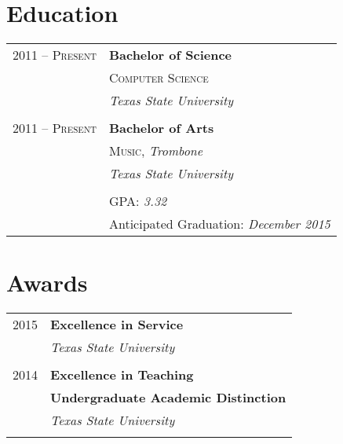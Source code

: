 \documentclass[10pt]{article} %
\begin{document}
\begin{minipage}[t]{0.44\textwidth}

\section{Education} 

\begin{tabular}{rl} %


2011 -- \textsc{Present} & \textbf{Bachelor of Science} \\ 
& \textsc{Computer Science} \\ 
& \textit{Texas State University}\\
&\\
	 

2011 -- \textsc{Present} & \textbf{Bachelor of Arts} \\ 
& \textsc{Music}, \textit{Trombone}\\ 
& \textit{Texas State University}\\ \\

& \large GPA: \textit{3.32} \\
& Anticipated Graduation: \textit{December 2015}\\

\end{tabular}


\section{Awards} 

\begin{tabular}{rl}
2015     & \textbf{Excellence in Service}\\
& \textit{Texas State University}\\ \\
2014	 & \textbf{Excellence in Teaching}\\
	 & \textbf{Undergraduate Academic Distinction}\\
& \textit{Texas State University}\\ \\


\end{tabular}
\end{minipage}
\end{document}
